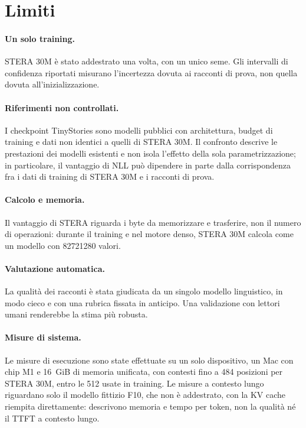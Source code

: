 \section{Limiti}

\paragraph{Un solo training.} STERA 30M è stato addestrato una volta, con un unico seme. Gli intervalli di confidenza riportati misurano l'incertezza dovuta ai racconti di prova, non quella dovuta all'inizializzazione.

\paragraph{Riferimenti non controllati.} I checkpoint TinyStories sono modelli pubblici con architettura, budget di training e dati non identici a quelli di STERA 30M. Il confronto descrive le prestazioni dei modelli esistenti e non isola l'effetto della sola parametrizzazione; in particolare, il vantaggio di NLL può dipendere in parte dalla corrispondenza fra i dati di training di STERA 30M e i racconti di prova.

\paragraph{Calcolo e memoria.} Il vantaggio di STERA riguarda i byte da memorizzare e trasferire, non il numero di operazioni: durante il training e nel motore denso, STERA 30M calcola come un modello con \num{82721280} valori.

\paragraph{Valutazione automatica.} La qualità dei racconti è stata giudicata da un singolo modello linguistico, in modo cieco e con una rubrica fissata in anticipo. Una validazione con lettori umani renderebbe la stima più robusta.

\paragraph{Misure di sistema.} Le misure di esecuzione sono state effettuate su un solo dispositivo, un Mac con chip M1 e 16~GiB di memoria unificata, con contesti fino a 484 posizioni per STERA 30M, entro le 512 usate in training. Le misure a contesto lungo riguardano solo il modello fittizio F10, che non è addestrato, con la KV cache riempita direttamente: descrivono memoria e tempo per token, non la qualità né il TTFT a contesto lungo.

